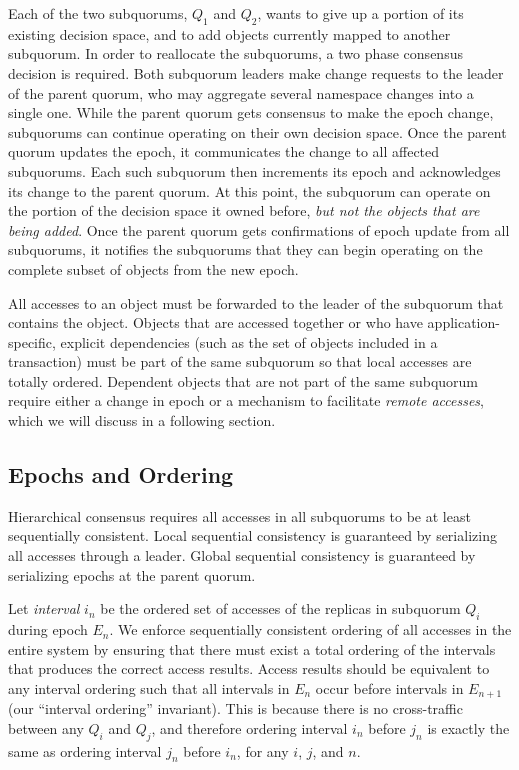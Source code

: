 \documentclass[11pt,letterpaper]{article}
\begin{document}
Each of the two subquorums, $Q_1$ and $Q_2$, wants to give up a portion of its
existing decision space, and to add objects currently mapped to another subquorum.
In order to reallocate the subquorums, a two phase consensus decision is required.
Both subquorum leaders make change requests to the leader of the parent quorum, who may
aggregate several namespace changes into a single one.
While the parent quorum gets consensus to make the epoch change, subquorums can continue
operating on their own decision space.
Once the parent quorum updates the epoch, it communicates the change to all affected
subquorums.
Each such subquorum then increments its epoch and acknowledges its change to the parent
quorum.
At this point, the subquorum can operate on the portion of the decision space it owned
before, \emph{but not the objects that are being added}.
Once the parent quorum gets confirmations of epoch update from all subquorums, it notifies
the subquorums that they can begin operating on the complete subset of objects from the
new epoch.

All accesses to an object must be forwarded to the leader of the subquorum that contains
the object.
Objects that are accessed together or who have application-specific, explicit
dependencies (such as the set of objects included in a transaction) must be part of the
same subquorum so that local accesses are totally ordered.
Dependent objects that are not part of the same subquorum require either a change in
epoch or a mechanism to facilitate \textit{remote accesses}, which we will discuss in a
following section.

\subsection{Epochs and Ordering}

Hierarchical consensus requires all accesses in all subquorums to be at least
sequentially consistent.
Local sequential consistency is guaranteed by serializing all accesses through a leader.
Global sequential consistency is guaranteed by serializing epochs at the parent quorum.

Let \emph{interval} $i_n$ be the ordered set of accesses of the replicas in subquorum
$Q_i$ during epoch $E_n$.
We enforce sequentially consistent ordering of all accesses in the entire system by
ensuring that there must exist a total ordering of the intervals that produces the correct
access results.
Access results should be equivalent to any interval ordering
such that all intervals in $E_n$ occur before intervals in $E_{n+1}$ (our ``interval
ordering'' invariant).
This is because there is no cross-traffic between any $Q_i$ and $Q_j$, and therefore
ordering interval $i_n$ before $j_n$ is exactly the same as ordering interval $j_n$
before $i_n$, for any $i$, $j$, and $n$.
\end{document}
